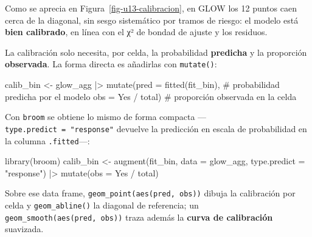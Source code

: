 \documentclass[
  letterpaper,
  DIV=11,
  numbers=noendperiod]{scrartcl}
\newenvironment{Shaded}{\begin{snugshade}}{\end{snugshade}}
\newcommand{\AttributeTok}[1]{\textcolor[rgb]{0.40,0.45,0.13}{#1}}
\newcommand{\CommentTok}[1]{\textcolor[rgb]{0.37,0.37,0.37}{#1}}
\newcommand{\FunctionTok}[1]{\textcolor[rgb]{0.28,0.35,0.67}{#1}}
\newcommand{\NormalTok}[1]{\textcolor[rgb]{0.00,0.23,0.31}{#1}}
\newcommand{\OtherTok}[1]{\textcolor[rgb]{0.00,0.23,0.31}{#1}}
\newcommand{\SpecialCharTok}[1]{\textcolor[rgb]{0.37,0.37,0.37}{#1}}
\newcommand{\StringTok}[1]{\textcolor[rgb]{0.13,0.47,0.30}{#1}}
\begin{document}
Como se aprecia en Figura~\ref{fig-u13-calibracion}, en GLOW los 12
puntos caen cerca de la diagonal, sin sesgo sistemático por tramos de
riesgo: el modelo está \textbf{bien calibrado}, en línea con el χ² de
bondad de ajuste y los residuos.

\begin{tcolorbox}[enhanced jigsaw, coltitle=black, rightrule=.15mm, arc=.35mm, leftrule=.75mm, colback=white, colbacktitle=quarto-callout-tip-color!10!white, left=2mm, breakable, toptitle=1mm, toprule=.15mm, bottomtitle=1mm, titlerule=0mm, title=\textcolor{quarto-callout-tip-color}{\faLightbulb}\hspace{0.5em}{🔧 En R. El data frame de observados vs predichos para la calibración}, bottomrule=.15mm, opacityback=0, opacitybacktitle=0.6, colframe=quarto-callout-tip-color-frame]

La calibración solo necesita, por celda, la probabilidad
\textbf{predicha} y la proporción \textbf{observada}. La forma directa
es añadirlas con \texttt{mutate()}:

\begin{Shaded}
\begin{Highlighting}[]
\NormalTok{calib\_bin }\OtherTok{\textless{}{-}}\NormalTok{ glow\_agg }\SpecialCharTok{|\textgreater{}}
  \FunctionTok{mutate}\NormalTok{(}\AttributeTok{pred =} \FunctionTok{fitted}\NormalTok{(fit\_bin),     }\CommentTok{\# probabilidad predicha por el modelo}
         \AttributeTok{obs  =}\NormalTok{ Yes }\SpecialCharTok{/}\NormalTok{ total)         }\CommentTok{\# proporción observada en la celda}
\end{Highlighting}
\end{Shaded}

Con \texttt{broom} se obtiene lo mismo de forma compacta
---\texttt{type.predict\ =\ "response"} devuelve la predicción en escala
de probabilidad en la columna \texttt{.fitted}---:

\begin{Shaded}
\begin{Highlighting}[]
\FunctionTok{library}\NormalTok{(broom)}
\NormalTok{calib\_bin }\OtherTok{\textless{}{-}} \FunctionTok{augment}\NormalTok{(fit\_bin, }\AttributeTok{data =}\NormalTok{ glow\_agg, }\AttributeTok{type.predict =} \StringTok{"response"}\NormalTok{) }\SpecialCharTok{|\textgreater{}}
  \FunctionTok{mutate}\NormalTok{(}\AttributeTok{obs =}\NormalTok{ Yes }\SpecialCharTok{/}\NormalTok{ total)}
\end{Highlighting}
\end{Shaded}

Sobre ese data frame, \texttt{geom\_point(aes(pred,\ obs))} dibuja la
calibración por celda y \texttt{geom\_abline()} la diagonal de
referencia; un \texttt{geom\_smooth(aes(pred,\ obs))} traza además la
\textbf{curva de calibración} suavizada.

\end{tcolorbox}
\end{document}

